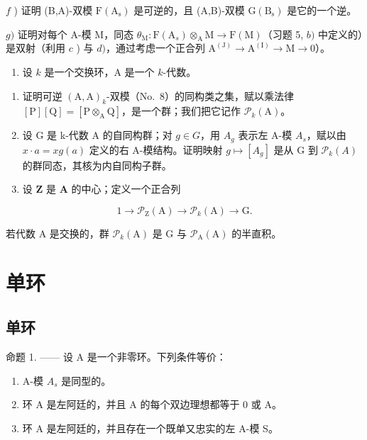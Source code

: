 \(f\) ) 证明 (B,A)-双模 \(\mathrm{F(A_s)}\) 是可逆的，且 (A,B)-双模 \(\mathrm{G(B_s)}\) 是它的一个逆。

\(g)\) 证明对每个 A-模 M，同态 \(\theta_{\mathrm{M}}: \mathrm{F}(\mathrm{A}_s) \otimes_{\mathrm{A}} \mathrm{M} \to \mathrm{F}(\mathrm{M})\)（习题 5, \(b)\) 中定义的）是双射（利用 \(c\) ) 与 \(d)\)，通过考虑一个正合列 \(\mathrm{A}^{(\mathrm{J})} \to \mathrm{A}^{(\mathrm{I})} \to \mathrm{M} \to 0\)）。

\begin{enumerate}
\def\labelenumi{\arabic{enumi})}
\setcounter{enumi}{7}
\tightlist
\item
  设 \(k\) 是一个交换环，A 是一个 \(k\)-代数。
\end{enumerate}

\begin{enumerate}
\def\labelenumi{\alph{enumi})}
\item
  证明可逆 \((\mathrm{A},\mathrm{A})_k\)-双模（No.~8）的同构类之集，赋以乘法律 \([\mathrm{P}][\mathrm{Q}] = [\mathrm{P}\otimes_{\mathrm{A}}\mathrm{Q}]\)，是一个群；我们把它记作 \(\mathcal{P}_k(\mathrm{A})\)。
\item
  设 G 是 k-代数 A 的自同构群；对 \(g \in G\)，用 \(A_{g}\) 表示左 A-模 \(A_{s}\)，赋以由 \(x \cdot a = x g(a)\) 定义的右 A-模结构。证明映射 \(g \mapsto [A_{g}]\) 是从 G 到 \(\mathcal{P}_{k}(A)\) 的群同态，其核为内自同构子群。
\item
  设 \(\mathbf{Z}\) 是 \(\mathbf{A}\) 的中心；定义一个正合列
\end{enumerate}

\[
1 \to \mathcal {P} _ {\mathrm{Z}} (\mathrm{A}) \to \mathcal {P} _ {k} (\mathrm{A}) \to \mathrm{G}.
\]

若代数 A 是交换的，群 \(\mathcal{P}_{k}(\mathrm{A})\) 是 G 与 \(\mathcal{P}_{\mathrm{A}}(\mathrm{A})\) 的半直积。

\section{单环}

\subsection{单环}

命题 1. —— 设 A 是一个非零环。下列条件等价：

\begin{enumerate}
\def\labelenumi{(\roman{enumi})}
\item
  A-模 \(A_{s}\) 是同型的。
\item
  环 A 是左阿廷的，并且 A 的每个双边理想都等于 0 或 A。
\item
  环 A 是左阿廷的，并且存在一个既单又忠实的左 A-模 S。
\end{enumerate}

